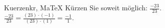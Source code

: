 \begin{MAufgabe}{Kuerzen}{kr, MaTeX}
K\"urzen Sie soweit m\"oglich: $\frac{-23}{23}$.\\ 
\ifLsg\MLoesung
\quad $\frac{-23}{23}=\frac{(23)\cdot(-1)}{(23)\cdot(1)}=\frac{-1}{1}$.\else\relax\fi
 \end{MAufgabe}
